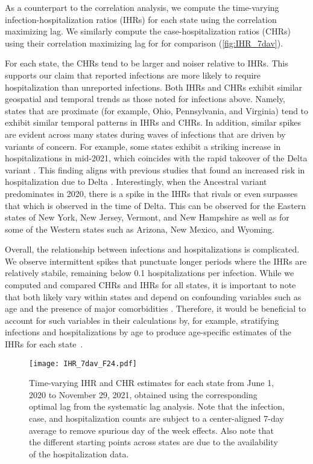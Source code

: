 As a counterpart to the correlation analysis, we compute the time-varying
infection-hospitalization ratios (IHRs) for each state using the correlation
maximizing lag. We similarly compute the case-hospitalization ratios (CHRs)
using their correlation maximizing lag for for comparison
(\autoref{fig:IHR_7dav}). 

For each state, the CHRs tend to be larger and noiser relative to IHRs. This
supports our claim that reported infections are more likely to require
hospitalization than unreported infections. Both IHRs and CHRs exhibit similar
geospatial and temporal trends as those noted for infections above. Namely,
states that are proximate (for example, Ohio, Pennsylvania, and Virginia) tend
to exhibit similar temporal patterns in IHRs and CHRs. In addition, similar
spikes are evident across many states during waves of infections that are driven
by variants of concern. For example, some states exhibit a striking increase in
hospitalizations in mid-2021, which coincides with the rapid takeover of the Delta
variant \citep{hodcroft2021covariants}. This finding aligns with previous
studies that found an increased risk in hospitalization due to Delta
\citep{twohig2022hospital, nyberg2022comparative}. Interestingly, when the 
Ancestral variant predominates in 2020, there is a spike in the IHRs that rivals or even surpasses 
that which is observed in the time of Delta. This can be observed for the Eastern states of 
New York, New Jersey, Vermont, and New Hampshire as well as for some of the 
Western states such as Arizona, New Mexico, and Wyoming.

Overall, the relationship between infections and hospitalizations is
complicated. We observe intermittent spikes that punctuate longer periods where
the IHRs are relatively stabile, remaining below 0.1 hospitalizations per
infection. While we computed and compared CHRs and IHRs for all states, it is important to
note that both likely vary within states and depend on confounding variables
such as age and the presence of major comorbidities
\citep{russell2023comorbidities}. Therefore, it would be beneficial to account
for such variables in their calculations by, for example, stratifying infections
and hospitalizations by age to produce age-specific estimates of the IHRs for
each state~\citep{fox2023disproportionate}.



\begin{figure}[!tb]
\centering
\texttt{[image: IHR\_7dav\_F24.pdf]}
\caption{Time-varying IHR and CHR estimates for each state from June 1, 2020
to November 29, 2021, obtained using the corresponding optimal lag from the
systematic lag analysis. Note that the infection, case, and hospitalization
counts are subject to a center-aligned 7-day average to remove spurious day
of the week effects. Also note that the different starting points across
states are due to the availability of the hospitalization data.}
\label{fig:IHR_7dav}
\end{figure}



